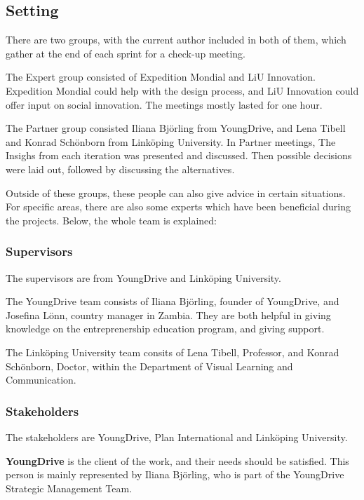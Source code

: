 \subsection{Setting}

There are two groups, with the current author included in both of them, which gather at the end of each sprint for a check-up meeting.

The Expert group consisted of Expedition Mondial and LiU Innovation. Expedition Mondial could help with the design process, and LiU Innovation could offer input on social innovation. The meetings mostly lasted for one hour.

The Partner group consisted Iliana Björling from YoungDrive, and Lena Tibell and Konrad Schönborn from Linköping University. In Partner meetings, The Insighs from each iteration was presented and discussed. Then possible decisions were laid out, followed by discussing the alternatives. %

Outside of these groups, these people can also give advice in certain situations. For specific areas, there are also some experts which have been beneficial during the projects. Below, the whole team is explained:

\subsubsection{Supervisors}
The supervisors are from YoungDrive and Linköping University.

The YoungDrive team consists of Iliana Björling, founder of YoungDrive, and Josefina Lönn, country manager in Zambia. They are both helpful in giving knowledge on the entreprenership education program, and giving support.

The Linköping University team consits of Lena Tibell, Professor, and Konrad Schönborn, Doctor, within the Department of Visual Learning and Communication.

\subsubsection{Stakeholders}
The stakeholders are YoungDrive, Plan International and Linköping University.

\textbf{YoungDrive} is the client of the work, and their needs should be satisfied. This person is mainly represented by Iliana Björling, who is part of the YoungDrive Strategic Management Team.

